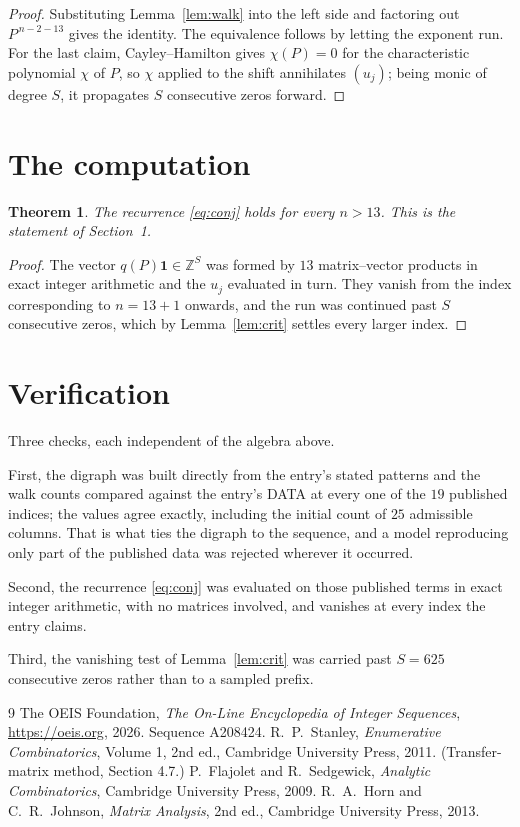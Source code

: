 \documentclass[11pt,a4paper]{article}
\theoremstyle{plain}
\newtheorem{theorem}{Theorem}
\theoremstyle{definition}
\begin{document}
\begin{proof}
Substituting Lemma~\ref{lem:walk} into the left side and factoring out
$P^{\,n-2-13}$ gives the identity. The equivalence follows by letting the exponent
run. For the last claim, Cayley--Hamilton gives $\chi(P)=0$ for the characteristic
polynomial $\chi$ of $P$, so $\chi$ applied to the shift annihilates $(u_j)$; being monic of
degree $S$, it propagates $S$ consecutive zeros forward.
\end{proof}

\section{The computation}

\begin{theorem}
The recurrence \eqref{eq:conj} holds for every $n>13$. This is the statement of
Section~1.
\end{theorem}

\begin{proof}
The vector $q(P)\mathbf{1}\in\mathbb{Z}^{S}$ was formed by $13$ matrix--vector
products in exact integer arithmetic and the $u_j$ evaluated in turn. They vanish from the
index corresponding to $n=13+1$ onwards, and the run was continued past $S$ consecutive
zeros, which by Lemma~\ref{lem:crit} settles every larger index.
\end{proof}

\section{Verification}

Three checks, each independent of the algebra above.

First, the digraph was built directly from the entry's stated patterns and the walk counts
compared against the entry's DATA at every one of the $19$ published indices; the
values agree exactly, including the initial count of $25$ admissible columns. That is
what ties the digraph to the sequence, and a model reproducing only part of the published
data was rejected wherever it occurred.

Second, the recurrence \eqref{eq:conj} was evaluated on those published terms in exact
integer arithmetic, with no matrices involved, and vanishes at every index the entry claims.

Third, the vanishing test of Lemma~\ref{lem:crit} was carried past $S=625$ consecutive
zeros rather than to a sampled prefix.

\begin{thebibliography}{9}
 The OEIS Foundation, \emph{The On-Line Encyclopedia of Integer
Sequences}, \url{https://oeis.org}, 2026. Sequence A208424.
 R.~P.~Stanley, \emph{Enumerative Combinatorics}, Volume 1, 2nd ed.,
Cambridge University Press, 2011. (Transfer-matrix method, Section 4.7.)
 P.~Flajolet and R.~Sedgewick, \emph{Analytic Combinatorics}, Cambridge
University Press, 2009.
 R.~A.~Horn and C.~R.~Johnson, \emph{Matrix Analysis}, 2nd ed., Cambridge
University Press, 2013.
\end{thebibliography}
\end{document}
